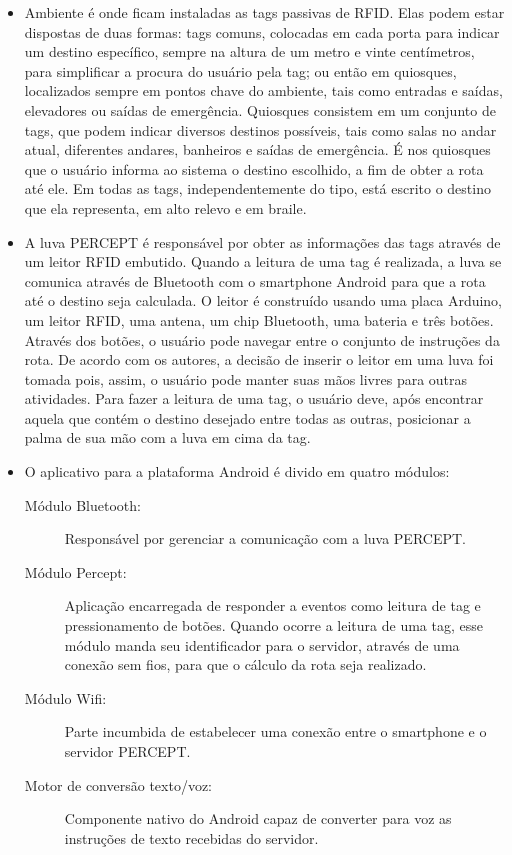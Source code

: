 \documentclass[english,brazilian]{UNISINOSmonografia}
\begin{document}
\begin{itemize}
	\item Ambiente é onde ficam instaladas as tags passivas de RFID. Elas podem estar dispostas de duas formas: tags comuns, colocadas em cada porta para indicar um destino específico, sempre na altura de um metro e vinte centímetros, para simplificar a procura do usuário pela tag; ou então em quiosques, localizados sempre em pontos chave do ambiente, tais como entradas e saídas, elevadores ou saídas de emergência. Quiosques consistem em um conjunto de tags, que podem indicar diversos destinos possíveis, tais como salas no andar atual, diferentes andares, banheiros e saídas de emergência. É nos quiosques que o usuário informa ao sistema o destino escolhido, a fim de obter a rota até ele. Em todas as tags, independentemente do tipo, está escrito o destino que ela representa, em alto relevo e em braile.
	
	\item A luva PERCEPT é responsável por obter as informações das tags através de um leitor RFID embutido. Quando a leitura de uma tag é realizada, a luva se comunica através de Bluetooth com o smartphone Android para que a rota até o destino seja calculada. O leitor é construído usando uma placa Arduino, um leitor RFID, uma antena, um chip Bluetooth, uma bateria e três botões. Através dos botões, o usuário pode navegar entre o conjunto de instruções da rota. De acordo com os autores, a decisão de inserir o leitor em uma luva foi tomada pois, assim, o usuário pode manter suas mãos livres para outras atividades. Para fazer a leitura de uma tag, o usuário deve, após encontrar aquela que contém o destino desejado entre todas as outras, posicionar a palma de sua mão com a luva em cima da tag.

	\item O aplicativo para a plataforma Android é divido em quatro módulos:
	\begin{description}
		\item[Módulo Bluetooth:] Responsável por gerenciar a comunicação com a luva PERCEPT.
		\item[Módulo Percept:] Aplicação encarregada de responder a eventos como leitura de tag e pressionamento de botões. Quando ocorre a leitura de uma tag, esse módulo manda seu identificador para o servidor, através de uma conexão sem fios, para que o cálculo da rota seja realizado.
		\item [Módulo Wifi:] Parte incumbida de estabelecer uma conexão entre o smartphone e o servidor PERCEPT.
		\item [Motor de conversão texto/voz:] Componente nativo do Android capaz de converter para voz as instruções de texto recebidas do servidor.
	\end{description}


\end{itemize}
\end{document}
